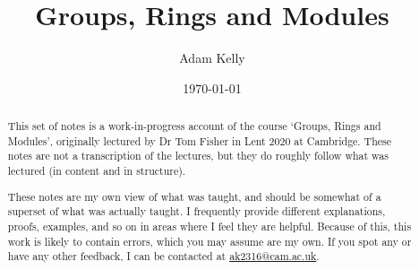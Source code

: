 \documentclass[a4paper]{scrartcl}
\title{Groups, Rings and Modules}
\author{Adam Kelly}
\date{\today}
\begin{document}
\maketitle

\newcommand{\newchapter}{\section}
\newcommand{\newsection}{\subsection}
\newcommand{\newsubsection}{\subsubsection}
\newcommand{\newsubsubsection}{\subsubsubsection}

\begin{abstract}
	

	This set of notes is a work-in-progress account of the course `Groups, Rings and Modules', originally lectured by Dr Tom Fisher in Lent 2020 at Cambridge. These notes are not a transcription of the lectures, but they do roughly follow what was lectured (in content and in structure).

	These notes are my own view of what was taught, and should be somewhat of a superset of what was actually taught. I frequently provide different explanations, proofs, examples, and so on in areas where I feel they are helpful. Because of this, this work is likely to contain errors, which you may assume are my own. If you spot any or have any other feedback, I can be contacted at \href{mailto:ak2316@cam.ac.uk}{ak2316@cam.ac.uk}.



\end{abstract}
\end{document}
